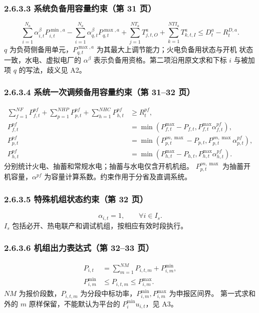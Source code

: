 \subsubsection{2.6.3.3 系统负备用容量约束（第 31 页）}
\begin{equation}
 \sum_{i=1}^{N_a}\alpha^\beta_{i,t}P^{\min,a}_{i,t}
 -\sum_{i=1}^{N_a}\alpha^\beta_{q,t}P^{\max,a}_{q,t}
 +\sum_{j=1}^{NT_a}T^a_{j,t,O}+\sum_{k=1}^{NTI_a}T^a_{k,t,I}
 \le D^a_t-R^{D,a}_t.
\end{equation}
$q$ 为负荷侧备用单元，$P^{\max,a}_{q,t}$ 为其最大上调节能力；火电负备用状态与开机
状态一致，水电、虚拟电厂的 $\alpha^\beta$ 表示负备用资格。第二项沿用原文求和下标
$i$ 与被加项 $q$ 的写法，歧义见 A2。

\subsubsection{2.6.3.4 系统一次调频备用容量约束（第 31--32 页）}
\begin{align}
 \sum_{f=1}^{NF}P^{pf}_{f,t}+\sum_{p=1}^{NHP}P^{pf}_{p,t}
 +\sum_{h=1}^{NHC}P^{pf}_{h,t}&\ge R^{pf}_t,\\
 P^{pf}_{f,t}&=\min(P^{\max}_{f,t}-P_{f,t},P^{\max}_{f,t}\alpha^{pf}_{f,t}),\\
 P^{pf}_{p,t}&=\min(P^{on,\max}_{p,t}-P_{p,t},P^{on,\max}_{p,t}\alpha^{pf}_{p,t}),\\
 P^{pf}_{h,t}&=\min(P^{\max}_{h,t}-P_{h,t},P^{\max}_{h,t}\alpha^{pf}_{h,t}).
\end{align}
分别统计火电、抽蓄和常规水电；抽蓄与水电仅含开机机组。
$P^{on,\max}_{p,t}$ 为抽蓄开机容量，$\alpha^{pf}$ 为容量计算系数。约束作用于分省及直调系统。

\subsubsection{2.6.3.5 特殊机组状态约束（第 32 页）}
\begin{equation}
 \alpha_{i,t}=1,\qquad \forall i\in I_s.
\end{equation}
$I_s$ 包括必开、热电联产和调试机组，按相应有效时段执行。

\subsubsection{2.6.3.6 机组出力表达式（第 32--33 页）}
\begin{align}
 P_{i,t}&=\sum_{m=1}^{NM}P_{i,t,m}+P^{\min}_{i,m},\\
 P^{\min}_{i,m}&\le P_{i,t,m}\le P^{\max}_{i,m}.
\end{align}
$NM$ 为报价段数，$P_{i,t,m}$ 为分段中标功率，$P^{\min}_{i,m},P^{\max}_{i,m}$ 为申报区间界。
第一式求和外的 $m$ 原样保留，不能默认为平台的 $P^{\min}_iu_{i,t}$，见 A3。

